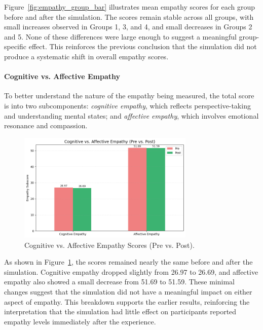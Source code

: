 \vspace{1em}

Figure~\ref{fig:empathy_group_bar} illustrates mean empathy scores for each group before and after the simulation. The scores remain stable across all groups, with small increases observed in Groups 1, 3, and 4, and small decreases in Groups 2 and 5. None of these differences were large enough to suggest a meaningful group-specific effect. This reinforces the previous conclusion that the simulation did not produce a systematic shift in overall empathy scores.

\paragraph{Cognitive vs. Affective Empathy}

To better understand the nature of the empathy being measured, the total score is into two subcomponents: \textit{cognitive empathy}, which reflects perspective-taking and understanding mental states; and \textit{affective empathy}, which involves emotional resonance and compassion.

\begin{figure}[htbp]
    \centering
    \includegraphics[width=0.75\textwidth]{../../Figures/cog-vs-affect.png}
    \caption{Cognitive vs. Affective Empathy Scores (Pre vs. Post).}
    \label{fig:empathy_cog_aff}
\end{figure}

\vspace{1em}

As shown in Figure~\ref{fig:empathy_cog_aff}, the scores remained nearly the same before and after the simulation. Cognitive empathy dropped slightly from 26.97 to 26.69, and affective empathy also showed a small decrease from 51.69 to 51.59. These minimal changes suggest that the simulation did not have a meaningful impact on either aspect of empathy. This breakdown supports the earlier results, reinforcing the interpretation that the simulation had little effect on participants reported empathy levels immediately after the experience.


